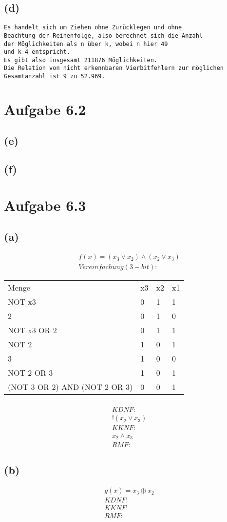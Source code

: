 \documentclass[12pt]{article}
\begin{document}
\subsection{(d)}
\begin{verbatim}
Es handelt sich um Ziehen ohne Zurücklegen und ohne
Beachtung der Reihenfolge, also berechnet sich die Anzahl
der Möglichkeiten als n über k, wobei n hier 49
und k 4 entspricht.
Es gibt also insgesamt 211876 Möglichkeiten.
Die Relation von nicht erkennbaren Vierbitfehlern zur möglichen
Gesamtanzahl ist 9 zu 52.969.
\end{verbatim}

\section{Aufgabe 6.2}
\subsection{(e)}

\subsection{(f)}


\section{Aufgabe 6.3}
\subsection{(a)}
\begin{align}
& f(x) = (\overline {x_3} \lor x_2) \land (\overline {x_2} \lor x_3)\\
&Vereinfachung (3-bit):
\end{align}
\begin{tabular} {l|l|l|l}
Menge & x3 & x2 & x1\\
NOT x3 & 0 & 1 & 1\\
2 & 0 & 1 & 0\\
NOT x3 OR 2 & 0 & 1 & 1\\
NOT 2 & 1 & 0 & 1\\
3  & 1 & 0 & 0\\
NOT 2 OR 3 & 1 & 0 & 1\\
(NOT 3 OR 2) AND (NOT 2 OR 3) & 0 & 0 & 1
\end{tabular}
\begin{align}
\\
& KDNF:\\
&! (x_2 \lor x_3)\\
& KKNF:\\
&x_2 \land x_3\\
& RMF:
\end{align}
\subsection{(b)}
\begin{align}
& g(x) = \overline {x_3} \oplus \overline {x_2}\\
& KDNF: \\
& KKNF:\\
& RMF:
\end{align}
\end{document}
